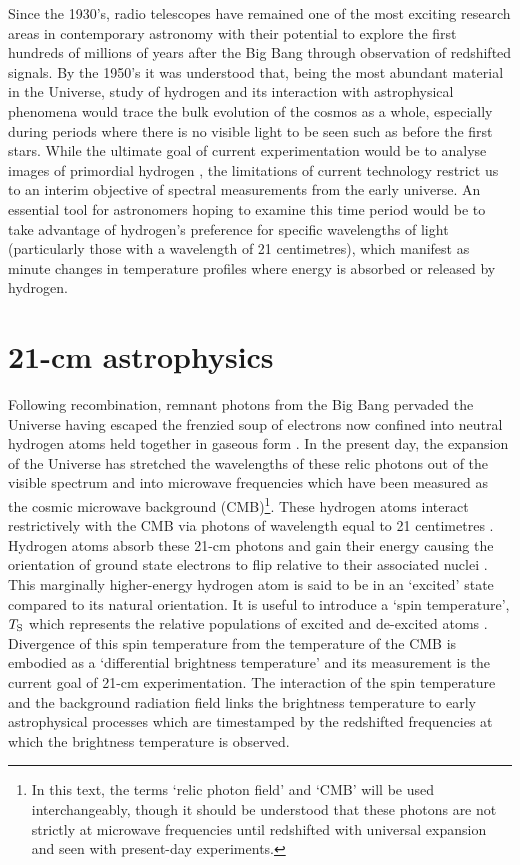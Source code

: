 Since the 1930’s, radio telescopes have remained one of the most exciting research areas in contemporary astronomy with their potential to explore the first hundreds of millions of years after the Big Bang through observation of redshifted signals. By the 1950’s it was understood that, being the most abundant material in the Universe, study of hydrogen and its interaction with astrophysical phenomena would trace the bulk evolution of the cosmos as a whole, especially during periods where there is no visible light to be seen such as before the first stars. While the ultimate goal of current experimentation would be to analyse images of primordial hydrogen \citep{liuData,21in21}, the limitations of current technology restrict us to an interim objective of spectral measurements from the early universe. An essential tool for astronomers hoping to examine this time period would be to take advantage of hydrogen’s preference for specific wavelengths of light (particularly those with a wavelength of 21 centimetres), which manifest as minute changes in temperature profiles where energy is absorbed or released by hydrogen.


\section{21-cm astrophysics}\label{sec:21cm}
Following recombination, remnant photons from the Big Bang pervaded the Universe having escaped the frenzied soup of electrons now confined into neutral hydrogen atoms held together in gaseous form \citep{ryden}. In the present day, the expansion of the Universe has stretched the wavelengths of these relic photons out of the visible spectrum and into microwave frequencies which have been measured as the cosmic microwave background (CMB)\footnote{In this text, the terms ‘relic photon field’ and ‘CMB’ will be used interchangeably, though it should be understood that these photons are not strictly at microwave frequencies until redshifted with universal expansion and seen with present-day experiments.}. These hydrogen atoms interact restrictively with the CMB via photons of wavelength equal to 21 centimetres \citep{lofar}. Hydrogen atoms absorb these 21-cm photons and gain their energy causing the orientation of ground state electrons to flip relative to their associated nuclei \citep{furProbe}. This marginally higher-energy hydrogen atom is said to be in an ‘excited’ state compared to its natural orientation. It is useful to introduce a ‘spin temperature’, $T_{\mathrm{S}}$ which represents the relative populations of excited and de-excited atoms \citep{furlanetto_spin_temp}. Divergence of this spin temperature from the temperature of the CMB is embodied as a ‘differential brightness temperature’ and its measurement is the current goal of 21-cm experimentation. The interaction of the spin temperature and the background radiation field links the brightness temperature to early astrophysical processes which are timestamped by the redshifted frequencies at which the brightness temperature is observed.

